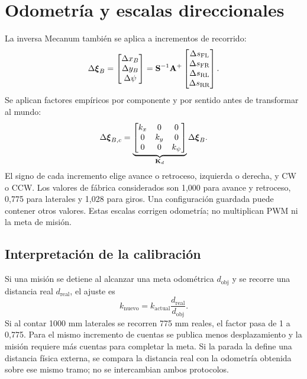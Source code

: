 \section{Odometría y escalas direccionales}
La inversa Mecanum también se aplica a incrementos de recorrido:
\begin{equation}
\Delta\boldsymbol{\xi}_B=\begin{bmatrix}\Delta x_B\\\Delta y_B\\\Delta\psi\end{bmatrix}
=\mathbf{S}^{-1}\mathbf{A}^+\begin{bmatrix}\Delta s_{\mathrm{FL}}\\\Delta s_{\mathrm{FR}}\\\Delta s_{\mathrm{RL}}\\\Delta s_{\mathrm{RR}}\end{bmatrix}.
\end{equation}
Se aplican factores empíricos por componente y por sentido antes de transformar al mundo:
\begin{equation}
\Delta\boldsymbol{\xi}_{B,c}=
\underbrace{\begin{bmatrix}k_x&0&0\\0&k_y&0\\0&0&k_\psi\end{bmatrix}}_{\mathbf{K}_d}
\Delta\boldsymbol{\xi}_B.
\end{equation}
El signo de cada incremento elige avance o retroceso, izquierda o derecha, y CW o CCW. Los valores de fábrica considerados son 1,000 para avance y retroceso, 0,775 para laterales y 1,028 para giros. Una configuración guardada puede contener otros valores. Estas escalas corrigen odometría; no multiplican PWM ni la meta de misión.

\subsection{Interpretación de la calibración}
Si una misión se detiene al alcanzar una meta odométrica $d_{\mathrm{obj}}$ y se recorre una distancia real $d_{\mathrm{real}}$, el ajuste es
\begin{equation}
k_{\mathrm{nuevo}}=k_{\mathrm{actual}}
\frac{d_{\mathrm{real}}}{d_{\mathrm{obj}}}.
\label{eq:ajustek}
\end{equation}
Si al contar 1000 mm laterales se recorren 775 mm reales, el factor pasa de 1 a 0,775. Para el mismo incremento de cuentas se publica menos desplazamiento y la misión requiere más cuentas para completar la meta. Si la parada la define una distancia física externa, se compara la distancia real con la odometría obtenida sobre ese mismo tramo; no se intercambian ambos protocolos.

